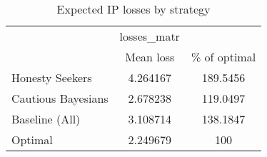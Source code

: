 \begin{table}[htbp]\centering
\caption{Expected IP losses by strategy}
\begin{tabular}{l*{2}{c}}
\hline\hline
            & losses\_matr&            \\
            &   Mean loss&\% of optimal\\
\hline
Honesty Seekers&    4.264167&    189.5456\\
Cautious Bayesians&    2.678238&    119.0497\\
Baseline (All)&    3.108714&    138.1847\\
Optimal     &    2.249679&         100\\
\hline\hline
\end{tabular}
\end{table}
